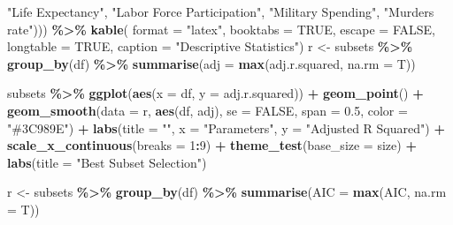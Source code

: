 \documentclass[
  english,
  man,floatsintext]{apa6}
\newenvironment{Shaded}{\begin{snugshade}}{\end{snugshade}}
\newcommand{\DataTypeTok}[1]{\textcolor[rgb]{0.13,0.29,0.53}{#1}}
\newcommand{\DecValTok}[1]{\textcolor[rgb]{0.00,0.00,0.81}{#1}}
\newcommand{\FloatTok}[1]{\textcolor[rgb]{0.00,0.00,0.81}{#1}}
\newcommand{\KeywordTok}[1]{\textcolor[rgb]{0.13,0.29,0.53}{\textbf{#1}}}
\newcommand{\NormalTok}[1]{#1}
\newcommand{\OperatorTok}[1]{\textcolor[rgb]{0.81,0.36,0.00}{\textbf{#1}}}
\newcommand{\OtherTok}[1]{\textcolor[rgb]{0.56,0.35,0.01}{#1}}
\newcommand{\StringTok}[1]{\textcolor[rgb]{0.31,0.60,0.02}{#1}}
\begin{document}
\begin{Shaded}
\begin{Highlighting}[]
                                       \StringTok{"Life Expectancy"}\NormalTok{, }
                                       \StringTok{"Labor Force Participation"}\NormalTok{, }
                                       \StringTok{"Military Spending"}\NormalTok{, }
                                       \StringTok{"Murders rate"}\NormalTok{))) }\OperatorTok{\%\textgreater{}\%}\StringTok{ }
\KeywordTok{kable}\NormalTok{(}
  \DataTypeTok{format =} \StringTok{"latex"}\NormalTok{,}
  \DataTypeTok{booktabs =} \OtherTok{TRUE}\NormalTok{,}
  \DataTypeTok{escape =} \OtherTok{FALSE}\NormalTok{,}
  \DataTypeTok{longtable =} \OtherTok{TRUE}\NormalTok{,}
 \DataTypeTok{caption =} \StringTok{"Descriptive Statistics"}\NormalTok{)}
\NormalTok{r \textless{}{-}}\StringTok{ }\NormalTok{subsets }\OperatorTok{\%\textgreater{}\%}\StringTok{ }
\StringTok{  }\KeywordTok{group\_by}\NormalTok{(df) }\OperatorTok{\%\textgreater{}\%}\StringTok{ }
\StringTok{  }\KeywordTok{summarise}\NormalTok{(}\DataTypeTok{adj =} \KeywordTok{max}\NormalTok{(adj.r.squared, }\DataTypeTok{na.rm =}\NormalTok{ T))}

\NormalTok{subsets }\OperatorTok{\%\textgreater{}\%}\StringTok{ }
\StringTok{  }\KeywordTok{ggplot}\NormalTok{(}\KeywordTok{aes}\NormalTok{(}\DataTypeTok{x =}\NormalTok{ df, }\DataTypeTok{y =}\NormalTok{ adj.r.squared)) }\OperatorTok{+}\StringTok{ }
\StringTok{  }\KeywordTok{geom\_point}\NormalTok{() }\OperatorTok{+}\StringTok{ }
\StringTok{  }\KeywordTok{geom\_smooth}\NormalTok{(}\DataTypeTok{data =}\NormalTok{ r, }\KeywordTok{aes}\NormalTok{(df, adj), }
              \DataTypeTok{se =} \OtherTok{FALSE}\NormalTok{, }\DataTypeTok{span =} \FloatTok{0.5}\NormalTok{, }\DataTypeTok{color =} \StringTok{"\#3C989E"}\NormalTok{) }\OperatorTok{+}\StringTok{ }
\StringTok{  }\KeywordTok{labs}\NormalTok{(}\DataTypeTok{title =} \StringTok{""}\NormalTok{, }\DataTypeTok{x =} \StringTok{"Parameters"}\NormalTok{, }\DataTypeTok{y =} \StringTok{"Adjusted R Squared"}\NormalTok{) }\OperatorTok{+}\StringTok{ }
\StringTok{  }\KeywordTok{scale\_x\_continuous}\NormalTok{(}\DataTypeTok{breaks =} \DecValTok{1}\OperatorTok{:}\DecValTok{9}\NormalTok{) }\OperatorTok{+}\StringTok{ }
\StringTok{  }\KeywordTok{theme\_test}\NormalTok{(}\DataTypeTok{base\_size =}\NormalTok{ size) }\OperatorTok{+}\StringTok{ }\KeywordTok{labs}\NormalTok{(}\DataTypeTok{title =} \StringTok{"Best Subset Selection"}\NormalTok{)}

\NormalTok{r \textless{}{-}}\StringTok{ }\NormalTok{subsets }\OperatorTok{\%\textgreater{}\%}\StringTok{ }
\StringTok{  }\KeywordTok{group\_by}\NormalTok{(df) }\OperatorTok{\%\textgreater{}\%}\StringTok{ }
\StringTok{  }\KeywordTok{summarise}\NormalTok{(}\DataTypeTok{AIC =} \KeywordTok{max}\NormalTok{(AIC, }\DataTypeTok{na.rm =}\NormalTok{ T))}


\end{Highlighting}
\end{Shaded}
\end{document}

